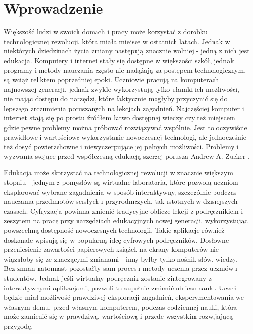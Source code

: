 \chapter{Wprowadzenie}
\label{cha:wprowadzenie}

Większość ludzi w swoich domach i pracy może korzystać z dorobku technologicznej rewolucji, która
miała miejsce w ostatnich latach. Jednak w niektórych dziedzinach życia zmiany następują znacznie
wolniej - jedną z nich jest edukacja. Komputery i internet stały się dostępne w większości szkół,
jednak programy i metody nauczania często nie nadążają za postępem technologicznym, są wciąż
reliktem poprzedniej epoki. Uczniowie pracują na komputerach najnowszej generacji, jednak zwykle
wykorzystują tylko ułamki ich możliwości, nie mając dostępu do narzędzi, które faktycznie mogłyby
przyczynić się do lepszego zrozumienia poruszanych na lekcjach zagadnień. Najczęściej komputer i
internet stają się po prostu źródłem łatwo dostępnej wiedzy czy też miejscem gdzie pewne problemy
można próbować rozwiązywać wspólnie. Jest to oczywiście prawidłowe i wartościowe wykorzystanie
nowoczesnej technologi, ale jednocześnie też dosyć powierzchowne i niewyczerpujące jej pełnych
możliwości. Problemy i wyzwania stojące przed współczesną edukacją szerzej porusza Andrew A. Zucker
\cite{Zuc2009}.

Edukacja może skorzystać na technologicznej rewolucji w znacznie większym stopniu - jednym z
pomysłów są wirtualne laboratoria, które pozwolą uczniom eksplorować wybrane zagadnienia w sposób
interaktywny, szczególnie podczas nauczania przedmiotów ścisłych i przyrodniczych, tak istotnych w
dzisiejszych czasach. Cyfryzacja powinna zmienić tradycyjne oblicze lekcji z podręcznikiem i
zeszytem na pracę przy narzędziach edukacyjnych nowej generacji, wykorzystując powszechną dostępność
nowoczesnych technologii. Takie aplikacje również doskonale wpisują się w popularną ideę cyfrowych
podręczników. Dosłowne przeniesienie zawartości papierowych książek na ekrany komputerów nie
wiązałoby się ze znaczącymi zmianami - inny byłby tylko nośnik słów, wiedzy. Bez zmian natomiast
pozostałby sam proces i metody uczenia przez uczniów i studentów. Jednak jeśli wirtualny podręcznik
zostanie zintegrowany z interaktywnymi aplikacjami, pozwoli to zupełnie zmienić oblicze nauki. Uczeń
będzie miał możliwość prawdziwej eksploracji zagadnień, eksperymentowania we własnym domu, przed
własnym komputerem, podczas codziennej nauki, która może zamienić się w prawdziwą, wartościową i
przede wszystkim rozwijającą przygodę.

